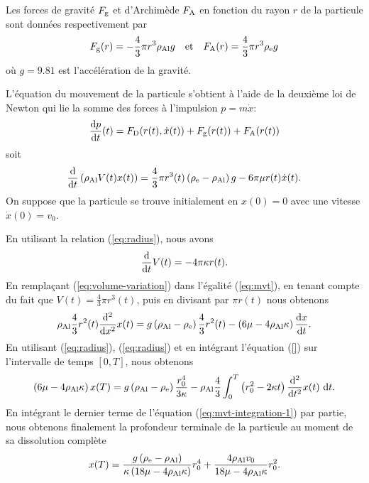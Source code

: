 Les forces de gravité $F_{\mathrm g}$ et d'Archimède $F_{\mathrm A}$
en fonction du rayon $r$ de la particule sont données respectivement
par
\begin{equation}
F_{\mathrm g}(r) = -\frac{4}{3}\pi r^3 \rho_\mathrm{Al} g
\quad\text{et}\quad
F_{\mathrm A}(r) = \frac{4}{3}\pi r^3 \rho_\mathrm{e} g
\end{equation}
où $g = 9.81$ est l'accélération de la gravité.

L'équation du mouvement de la particule s'obtient à l'aide de la
deuxième loi de Newton qui lie la somme des forces à l'impulsion $p =
m\dot x$:
\begin{equation}
\frac{\mathrm dp}{\mathrm dt}(t) = F_{\mathrm D}(r(t), \dot x(t)) + F_{\mathrm g}(r(t)) + F_{\mathrm A}(r(t))
\end{equation}
soit
\begin{equation}\label{eq:mvt}
  \frac{\mathrm d}{\mathrm dt}\left( \rho_\mathrm{Al} V(t)x(t) \right) =
  \frac{4}{3}\pi r^3(t)\left( \rho_\mathrm{e} - \rho_\mathrm{Al} \right)g -
  6\pi\mu r(t)\dot x(t).
\end{equation}
On suppose que la particule se trouve initialement en $x(0) = 0$ avec
une vitesse $\dot x(0) = v_0$.

En utilisant la relation (\ref{eq:radius}), nous avons
\begin{equation}\label{eq:volume-variation}
  \frac{\mathrm d}{\mathrm dt}V(t) = -4\pi \kappa r(t).
\end{equation}
En remplaçant (\ref{eq:volume-variation}) dans l'égalité
(\ref{eq:mvt}), en tenant compte du fait que $V(t) = \frac{4}{3}\pi
r^3(t)$, puis en divisant par $\pi r(t)$ nous obtenons
\begin{equation}
\rho_\mathrm{Al} \frac{4}{3}r^2(t)\frac{\mathrm d^2}{\mathrm dx^2}x(t)
= g\left( \rho_\mathrm{Al} - \rho_\mathrm{e} \right)\frac{4}{3}r^2(t) -
\left( 6\mu - 4\rho_\mathrm{Al}
  \kappa \right)\frac{\mathrm dx}{\mathrm dt}.
\end{equation}
En utilisant (\ref{eq:radius}), (\ref{eq:radius}) et en
intégrant l'équation (\ref{}) sur l'intervalle de temps $[0, T]$, nous
obtenons
\begin{equation}\label{eq:mvt-integration-1}
\left( 6\mu - 4\rho_\mathrm{Al}\kappa \right)x(T)
= g\left( \rho_\mathrm{Al} -
  \rho_\mathrm{e} \right)\frac{r_0^4}{3\kappa}-\rho_\mathrm{Al}\frac{4}{3}\int_0^T\left( r_0^2
- 2\kappa t \right)\frac{\mathrm d^2}{\mathrm dt^2}x(t)\,\,\mathrm dt.
\end{equation}
En intégrant le dernier terme de l'équation
(\ref{eq:mvt-integration-1}) par partie, nous obtenons finalement la
profondeur terminale de la particule au moment de sa dissolution complète
\begin{equation}\label{eq:particle-terminal-position}
x(T) = \frac{g\left( \rho_\mathrm{e} -
    \rho_\mathrm{Al} \right)}{\kappa
  \left( 18\mu - 4\rho_\mathrm{Al}
    \kappa \right)}r_0^4 + \frac{4 \rho_\mathrm{Al}
  v_0}{18\mu - 4\rho_\mathrm{Al} \kappa} r_0^2.
\end{equation}

